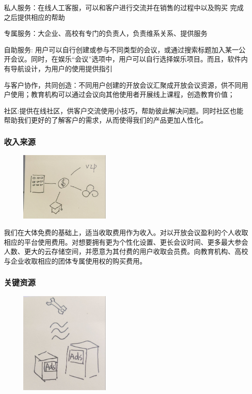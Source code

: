 \documentclass[a4paper,12pt]{article}
\begin{document}
    私人服务：在线人工客服，可以和客户进行交流并在销售的过程中以及购买 完成之后提供相应的帮助
    
    专属服务：大企业、高校有专门的负责人，负责维系关系、提供服务
    
    自助服务: 用户可以自行创建或参与不同类型的会议，或通过搜索标题加入某一公开会议。同时，在娱乐“会议”选项中，用户可以自行选择娱乐项目。而且，软件内有导航设计，为用户的使用提供指引
    
    与客户协作，共同创造：不同用户创建的开放会议汇聚成开放会议资源，供不同用户使用；教育机构可以通过会议向其他使用者开展线上课程，创造教育价值；
    
    社区:提供在线社区，供客户交流使用小技巧，帮助彼此解决问题。同时社区也能帮助我们更好的了解客户的需求，从而使得我们的产品更加人性化。
    \subsubsection{收入来源}

    \begin{figure}[H]
        \centering
        \includegraphics[width=0.4\textwidth]{收入来源.jpg}
    \end{figure}
    
    我们在大体免费的基础上，适当收取费用作为收入。对以开放会议盈利的个人收取相应的平台使用费用。对想要拥有更为个性化设置、更长会议时间、更多最大参会人数、更大的云存储空间，并愿意为其付费的用户收取会员费。向教育机构、高校与企业收取相应的团体专属使用权的购买费用。
    \subsubsection{关键资源}

    \begin{figure}[H]
        \centering
        \includegraphics[width=0.4\textwidth]{关键资源.jpg}
    \end{figure}
    
\end{document}
